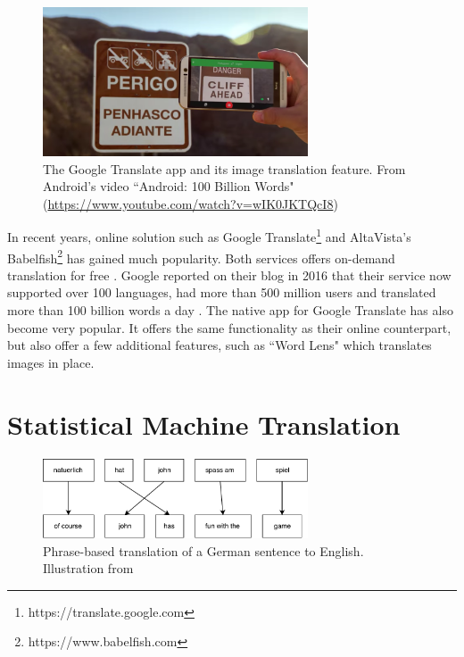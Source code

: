 \begin{figure}[H]
    \centering
    \includegraphics[width=0.7\textwidth]{fig/background_theory/google_translate_rt.png}
    \caption{The Google Translate app and its image translation feature. From Android's video ``Android: 100 Billion Words" (\url{https://www.youtube.com/watch?v=wIK0JKTQcI8})}
    \label{fig:google-translate-rt}
\end{figure}

In recent years, online solution such as Google Translate\footnote{https://translate.google.com} and AltaVista's Babelfish\footnote{https://www.babelfish.com} has gained much popularity. Both services offers on-demand translation for free \citep{hutchins2007machine}. Google reported on their blog in 2016 that their service now supported over 100 languages, had more than 500 million users and translated more than 100 billion words a day \citep{turovsky2016googletranslate}. The native app for Google Translate has also become very popular. It offers the same functionality as their online counterpart, but also offer a few additional features, such as ``Word Lens" which translates images in place.


\section{Statistical Machine Translation}
\begin{figure}[ht]
    \centering
    \includegraphics[width=0.7\textwidth]{fig/related_work/translation_de_en.pdf}
    \caption{Phrase-based translation of a German sentence to English. Illustration from \citep{koehn2010statistical}}
    \label{fig:translation-phrase-based}
\end{figure}

